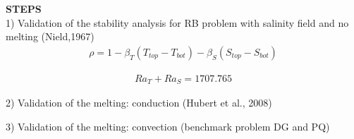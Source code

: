 \documentclass[onecolumn]{revtex4}
\begin{document}
\textbf{STEPS}\\

1) Validation of the stability analysis for RB problem with salinity field and no melting (Nield,1967) 
\begin{eqnarray}
\rho=1-\beta_T (T_{top}-T_{bot})-\beta_S (S_{top}-S_{bot})
\end{eqnarray}

\begin{eqnarray}
Ra_{T}+Ra_{S}=1707.765
\end{eqnarray}

2) Validation of the melting: conduction (Hubert et al., 2008)

3) Validation of the melting: convection (benchmark problem DG and PQ)
\end{document}
